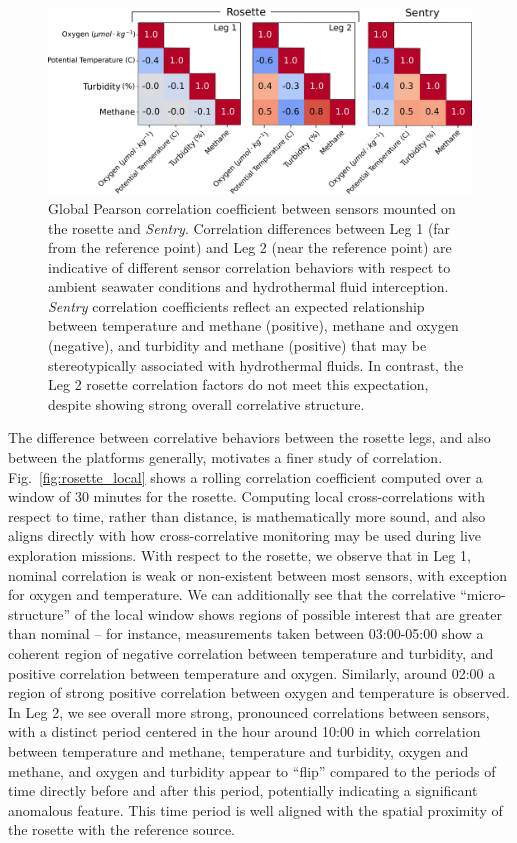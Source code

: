 \begin{figure}[h!]
    \centering
    \includegraphics[width=0.9\columnwidth]{figures/chap3_all_global_corr.jpg}
    \caption[Global pearson correlation coefficients]{Global Pearson correlation coefficient between sensors mounted on the rosette and \emph{Sentry}. Correlation differences between Leg 1 (far from the reference point) and Leg 2 (near the reference point) are indicative of different sensor correlation behaviors with respect to ambient seawater conditions and hydrothermal fluid interception. \emph{Sentry} correlation coefficients reflect an expected relationship between temperature and methane (positive), methane and oxygen (negative), and turbidity and methane (positive) that may be stereotypically associated with hydrothermal fluids. In contrast, the Leg 2 rosette correlation factors do not meet this expectation, despite showing strong overall correlative structure.}
    \label{fig:global_corr}
\end{figure}

The difference between correlative behaviors between the rosette legs, and also between the platforms generally, motivates a finer study of correlation. Fig.~\ref{fig:rosette_local} shows a rolling correlation coefficient computed over a window of 30 minutes for the rosette. Computing local cross-correlations with respect to time, rather than distance, is mathematically more sound, and also aligns directly with how cross-correlative monitoring may be used during live exploration missions. With respect to the rosette, we observe that in Leg 1, nominal correlation is weak or non-existent between most sensors, with exception for oxygen and temperature. We can additionally see that the correlative ``micro-structure'' of the local window shows regions of possible interest that are greater than nominal -- for instance, measurements taken between 03:00-05:00 show a coherent region of negative correlation between temperature and turbidity, and positive correlation between temperature and oxygen. Similarly, around 02:00 a region of strong positive correlation between oxygen and temperature is observed. In Leg 2, we see overall more strong, pronounced correlations between sensors, with a distinct period centered in the hour around 10:00 in which correlation between temperature and methane, temperature and turbidity, oxygen and methane, and oxygen and turbidity appear to ``flip'' compared to the periods of time directly before and after this period, potentially indicating a significant anomalous feature. This time period is well aligned with the spatial proximity of the rosette with the reference source.

